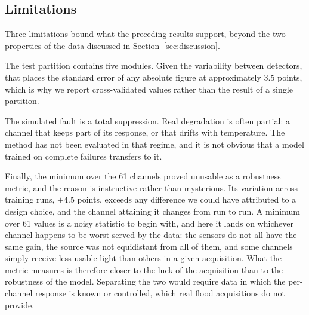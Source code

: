 \documentclass[10pt,conference]{IEEEtran}
\begin{document}
\subsection{Limitations}

Three limitations bound what the preceding results support, beyond the two
properties of the data discussed in Section~\ref{sec:discussion}.

The test partition contains five modules. Given the variability between
detectors, that places the standard error of any absolute figure at
approximately 3.5 points, which is why we report cross-validated values rather
than the result of a single partition.

The simulated fault is a total suppression. Real degradation is often partial:
a channel that keeps part of its response, or that drifts with temperature. The
method has not been evaluated in that regime, and it is not obvious that a
model trained on complete failures transfers to it.

Finally, the minimum over the 61 channels proved unusable as a robustness
metric, and the reason is instructive rather than mysterious. Its variation
across training runs, $\pm 4.5$ points, exceeds any difference we could have
attributed to a design choice, and the channel attaining it changes from run to
run. A minimum over 61 values is a noisy statistic to begin with, and here it
lands on whichever channel happens to be worst served by the data: the sensors
do not all have the same gain, the source was not equidistant from all of them,
and some channels simply receive less usable light than others in a given
acquisition. What the metric measures is therefore closer to the luck of the
acquisition than to the robustness of the model. Separating the two would
require data in which the per-channel response is known or controlled, which
real flood acquisitions do not provide.

\end{document}
